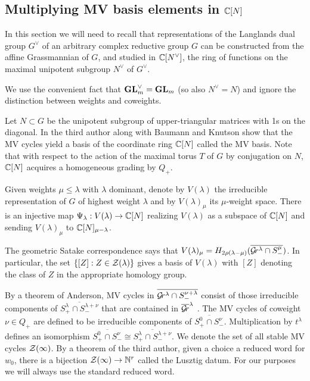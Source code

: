 \documentclass{article}
\begin{document}
% 
\subsection{Multiplying MV basis elements in \texorpdfstring{$\mathbb C[N]$}{C[N]}}
\label{ss:CN}
% 
In this section we will need to recall that representations of the Langlands dual group $G^\vee$ of an arbitrary complex reductive group $G$ can be constructed from the affine Grassmannian of $G$, and studied in $\mathbb C[N^\vee]$, the ring of functions on the maximal unipotent subgroup $N^\vee$ of $G^\vee$. 
% 

We use the convenient fact that ${\mathbf{GL}}_m^\vee = {\mathbf{GL}}_m$ (so also $N^\vee = N$) and ignore the distinction between weights and coweights. 

Let $N\subset G$ be the unipotent subgroup of upper-triangular matrices with 1s on the diagonal. In \cite{baumann2019mirkovic} the third author along with Baumann and Knutson show that the MV cycles yield a basis of the coordinate ring $\mathbb C[N]$ called the MV basis. Note that with respect to the action of the maximal torus $T$ of $G$ by conjugation on $N$, $\mathbb C[N]$ acquires a homogeneous grading by $Q_+$. 
% 

Given weights $\mu\le\lambda$ with $\lambda$ dominant, denote by $V(\lambda)$ the irreducible representation of $G$ of highest weight $\lambda$ and by $V(\lambda)_\mu$ its $\mu$-weight space. 
There is an injective map $ \Psi_\lambda: V(\lambda) \to \mathbb C[N]$ realizing $V(\lambda)$ as a subspace of $\mathbb C[N]$ and sending $ V(\lambda)_\mu$ to $\mathbb C[N]_{\mu - \lambda}$. 

The geometric Satake correspondence says that $V(\lambda)_\mu = H_{2\rho(\lambda-\mu)}(\overline{\mathcal{G}\!r^\lambda\cap S^\mu_-})$. In particular, the set $\{[Z] : Z\in\mathcal Z(\lambda)\}$ gives a basis of $V(\lambda)$ with $[Z]$ denoting the class of $Z$ in the appropriate homology group. 
% 

By a theorem of Anderson, MV cycles in $\overline{\mathcal{G}\!r^\lambda\cap S^{\nu + \lambda}_-}$ consist of those irreducible components of $ \overline{S^\lambda_+ \cap S^{\lambda+\nu}_-} $ that are contained in $\overline{\mathcal{G}\!r}^\lambda$ \cite[Proposition~3]{anderson2003polytope}. The  MV cycles of coweight $\nu\in Q_+$ are defined to be irreducible components of $\overline{S^0_+ \cap S^\nu_-}$.  Multiplication by $ t^\lambda $ defines an isomorphism $\overline{S^0_+ \cap S^\nu_-} \cong \overline{S^\lambda_+ \cap S^{\lambda+\nu}_-} $.  We denote the set of all stable MV cycles $\mathcal Z(\infty)$. 
% 
By a theorem of the third author, given a choice a reduced word for $ w_0 $, there is a bijection $ \mathcal Z(\infty) \rightarrow \mathbb N^{r} $ called the Lusztig datum.  For our purposes we will always use the standard reduced word.
\end{document}
